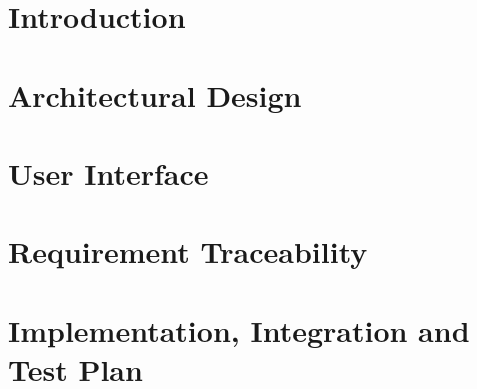 \setcounter{page}{2}


\newpage
{}
\tableofcontents
\newpage
{}
\listoffigures
{}
\listoftables

\clearpage
\section{Introduction}
\label{sect:introduction}


\clearpage
\section{Architectural Design}
\label{sect:architectural_design}


\clearpage
\section{User Interface}
\label{sect:user_interface}


\clearpage
\section{Requirement Traceability}
\label{sect:requirement_traceability}


\clearpage
\section{Implementation, Integration and Test Plan}
\label{sect:iit}



